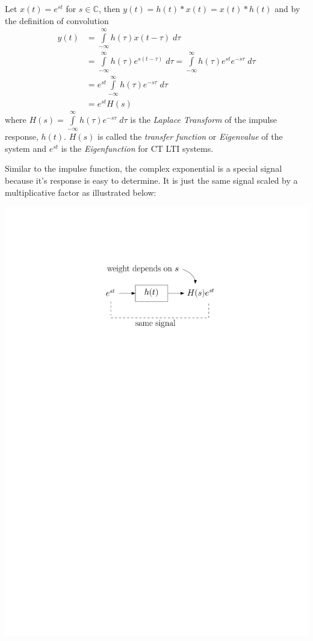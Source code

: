 Let $x(t) = e^{st}$ for $s\in \mathbb{C}$, then $y(t) = h(t) * x(t) = x(t) * h(t)$ and by the definition of convolution
\begin{align*}
  y(t) & = \int\limits_{-\infty}^{\infty}h(\tau)x(t-\tau)\; d\tau\\
  &= \int\limits_{-\infty}^{\infty}h(\tau)e^{s(t-\tau)}\; d\tau = \int\limits_{-\infty}^{\infty}h(\tau)e^{st}e^{-s\tau}\; d\tau\\
  &= e^{st} \int\limits_{-\infty}^{\infty}h(\tau)e^{-s\tau}\; d\tau\\
  &= e^{st}H(s)
\end{align*}
where $H(s) = \int\limits_{-\infty}^{\infty}h(\tau)e^{-s\tau}\; d\tau$ is the \emph{Laplace Transform} of the impulse response, $h(t)$. $H(s)$ is called the \emph{transfer function} or \emph{Eigenvalue} of the system and $e^{st}$ is the \emph{Eigenfunction} for CT LTI systems.

Similar to the impulse function, the complex exponential is a special signal because it's response is easy to determine. It is just the same signal scaled by a multiplicative factor as illustrated below:

\begin{center}
  \includegraphics[scale=0.6]{graphics/lti-ct-complex-exp.pdf}
\end{center}

